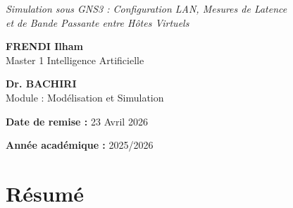 \documentclass[11pt,a4paper,oneside]{report}
\begin{document}
\begin{titlepage}
\begin{center}
    \vspace{0.5cm}
    {\large\itshape\color{accentblue} 
      Simulation sous GNS3 : Configuration LAN, Mesures de Latence\\
      et de Bande Passante entre Hôtes Virtuels}

    \vfill %

    \begin{minipage}[t]{0.48\textwidth}
      \begin{tcolorbox}[colframe=univblue!30, colback=white, title=\textbf{Présenté par :}, fonttitle=\small\bfseries]
        {\large\bfseries FRENDI Ilham}\\
 
        {\small Master 1 Intelligence Artificielle}
      \end{tcolorbox}
    \end{minipage}
    \hfill
    \begin{minipage}[t]{0.48\textwidth}
      \begin{tcolorbox}[colframe=univblue!30, colback=white, title=\textbf{Encadré par :}, fonttitle=\small\bfseries]
        {\large\bfseries Dr. BACHIRI}\\
        {\small Module : Modélisation et Simulation}
      \end{tcolorbox}
    \end{minipage}

    \vfill

    \makebox[\textwidth]{\color{univblue}\rule{\textwidth}{1.5pt}}
    \vspace{0.2cm}
    \begin{minipage}{0.45\textwidth}
      \raggedright \textbf{Date de remise :} 23 Avril 2026
    \end{minipage}
    \hfill
    \begin{minipage}{0.45\textwidth}
      \raggedleft \textbf{Année académique :} 2025/2026
    \end{minipage}
    
  \end{center}
  \restoregeometry
\end{titlepage}
\chapter*{R\'{e}sum\'{e}}
\end{document}
